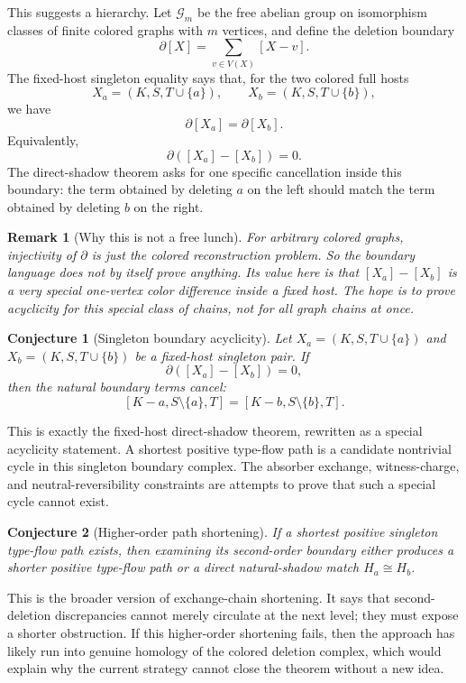 \documentclass[11pt]{article}
\newtheorem{conjecture}{Conjecture}
\newtheorem{remark}{Remark}
\begin{document}
This suggests a hierarchy.  Let \(\mathcal G_m\) be the free abelian group on
isomorphism classes of finite colored graphs with \(m\) vertices, and define
the deletion boundary
\[
  \partial[X]=\sum_{v\in V(X)}[X-v].
\]
The fixed-host singleton equality says that, for the two colored full hosts
\[
  X_a=(K,S,T\cup\{a\}),
  \qquad
  X_b=(K,S,T\cup\{b\}),
\]
we have
\[
  \partial[X_a]=\partial[X_b].
\]
Equivalently,
\[
  \partial([X_a]-[X_b])=0.
\]
The direct-shadow theorem asks for one specific cancellation inside this
boundary: the term obtained by deleting \(a\) on the left should match the
term obtained by deleting \(b\) on the right.

\begin{remark}[Why this is not a free lunch]
For arbitrary colored graphs, injectivity of \(\partial\) is just the colored
reconstruction problem.  So the boundary language does not by itself prove
anything.  Its value here is that \([X_a]-[X_b]\) is a very special
one-vertex color difference inside a fixed host.  The hope is to prove
acyclicity for this special class of chains, not for all graph chains at
once.
\end{remark}

\begin{conjecture}[Singleton boundary acyclicity]
Let \(X_a=(K,S,T\cup\{a\})\) and \(X_b=(K,S,T\cup\{b\})\) be a fixed-host
singleton pair.  If
\[
  \partial([X_a]-[X_b])=0,
\]
then the natural boundary terms cancel:
\[
  [K-a,S\setminus\{a\},T]
  =
  [K-b,S\setminus\{b\},T].
\]
\end{conjecture}

This is exactly the fixed-host direct-shadow theorem, rewritten as a special
acyclicity statement.  A shortest positive type-flow path is a candidate
nontrivial cycle in this singleton boundary complex.  The absorber exchange,
witness-charge, and neutral-reversibility constraints are attempts to prove
that such a special cycle cannot exist.

\begin{conjecture}[Higher-order path shortening]
If a shortest positive singleton type-flow path exists, then examining its
second-order boundary either produces a shorter positive type-flow path or a
direct natural-shadow match \(H_a\cong H_b\).
\end{conjecture}

This is the broader version of exchange-chain shortening.  It says that
second-deletion discrepancies cannot merely circulate at the next level; they
must expose a shorter obstruction.  If this higher-order shortening fails,
then the approach has likely run into genuine homology of the colored
deletion complex, which would explain why the current strategy cannot close
the theorem without a new idea.
\end{document}
